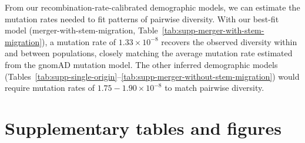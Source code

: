 \documentclass[]{article}
\begin{document}
From our recombination-rate-calibrated demographic models, we can estimate the
mutation rates needed to fit patterns of pairwise diversity. With our best-fit
model (merger-with-stem-migration,
Table~\ref{tab:supp-merger-with-stem-migration}), a mutation rate of
$1.33\times10^{-8}$ recovers the observed diversity within and between
populations, closely matching the average mutation rate estimated from the
gnomAD mutation model. The other inferred demographic models
(Tables~\ref{tab:supp-single-origin}--\ref{tab:supp-merger-without-stem-migration})
would require mutation rates of $1.75-1.90\times10^{-8}$ to match pairwise
diversity.






\clearpage

\section*{Supplementary tables and figures}
\end{document}
